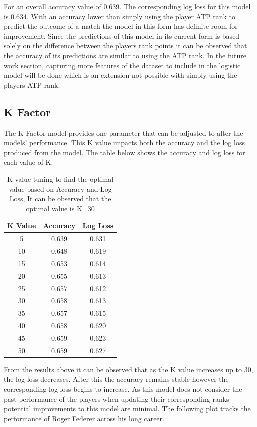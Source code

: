 \documentclass[12pt,a4paper]{article}
\begin{document}
For an overall accuracy value of 0.639. The corresponding log loss for this model is 0.634.
With an accuracy lower than simply using the player ATP rank to predict the outcome of a
match the model in this form has definite room for improvement. Since the predictions of
this model in its current form is based solely on the difference between the players rank
points it can be observed that the accuracy of its predictions are similar to using the ATP
rank. In the future work section, capturing more features of the dataset to include in the
logistic model will be done which is an extension not possible with simply using the players
ATP rank.
\subsection{K Factor}
The K Factor model provides one parameter that can be adjusted to alter the models' performance.
This K value impacts both the accuracy and the log loss produced from the model. The table
below shows the accuracy and log loss for each value of K.

\begin{table}[h]
  \centering
  \begin{tabular}{||c c c||}
    \hline
    K Value & Accuracy & Log Loss \\
    \hline\hline
    5       & 0.639    & 0.631    \\
    10      & 0.648    & 0.619    \\
    15      & 0.653    & 0.614    \\
    20      & 0.655    & 0.613    \\
    25      & 0.657    & 0.612    \\
    30      & 0.658    & 0.613    \\
    35      & 0.657    & 0.615    \\
    40      & 0.658    & 0.620    \\
    45      & 0.659    & 0.623    \\
    50      & 0.659    & 0.627    \\
    \hline
  \end{tabular}
  \caption{K value tuning to find the optimal value based on Accuracy and Log Loss, It
    can be observed that the optimal value is K=30}
\end{table}
From the results above it can be observed that as the K value increases up to 30, the log
loss decreases. After this the accuracy remains stable however the corresponding log loss
begins to increase. As this model does not consider the past performance of the players when updating their corresponding
ranks potential improvements to this model are minimal. The following plot tracks the performance
of Roger Federer across his long career.
\end{document}
